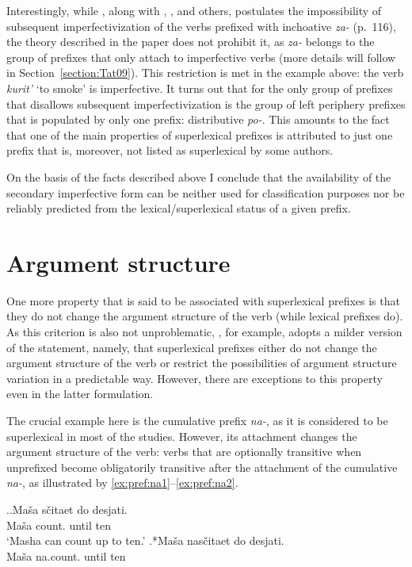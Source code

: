 Interestingly, while \citet{Tatevosov:09}, along with \citet{Svenonius:04b}, \citet{Ramchand:04}, and others, postulates the impossibility of subsequent imperfectivization of the verbs prefixed with inchoative \textit{za-} (p.~116), the theory described in the paper does not prohibit it, as \textit{za-} belongs to the group of prefixes that only attach to imperfective verbs (more details will follow in Section~\ref{section:Tat09}). This restriction is met in the example above: the verb \textit{kurit'}\textsuperscript{\IPF} `to smoke' is imperfective. It turns out that for \citet{Tatevosov:09} the only group of prefixes that disallows subsequent imperfectivization is the group of left periphery prefixes that is populated by only one prefix: distributive \textit{po-}. This amounts to the fact that one of the main properties of superlexical prefixes is attributed to just one prefix that is, moreover, not listed as superlexical by some authors.

On the basis of the facts described above I conclude that the availability of the secondary imperfective form can be neither used for classification purposes nor be reliably predicted from the lexical/superlexical status of a given prefix.

\section{Argument structure}\label{section:new:argstructure}
One more property that is said to be associated with superlexical prefixes is that they do not change the argument structure of the verb (while lexical prefixes do). As this criterion is also not unproblematic, \citet[116]{Tatevosov:09}, for example, adopts a milder version of the statement, namely, that superlexical prefixes either do not change the argument structure of the verb or restrict the possibilities of argument structure variation in a predictable way. However, there are exceptions to this property even in the latter formulation. 

The crucial example here is the cumulative prefix \textit{na-}, as it is considered to be superlexical in most of the studies. However, its attachment changes the argument structure of the verb: verbs that are optionally transitive when unprefixed become obligatorily transitive after the attachment of the cumulative \textit{na-}, as illustrated by \ref{ex:pref:na1}--\ref{ex:pref:na2}.

\ex.\label{ex:pref:na1}\ag.\label{ex:pref:na1a}Ma\v{s}a s\v{c}itaet\textsuperscript{\IPF} do desjati.\\
Ma\v{s}a count. until ten\\
\trans `Masha can count up to ten.'
\bg.*Ma\v{s}a nas\v{c}itaet\textsuperscript{\PF} do desjati.\label{ex:pref:na1b}\\
Ma\v{s}a na.count. until ten\\

